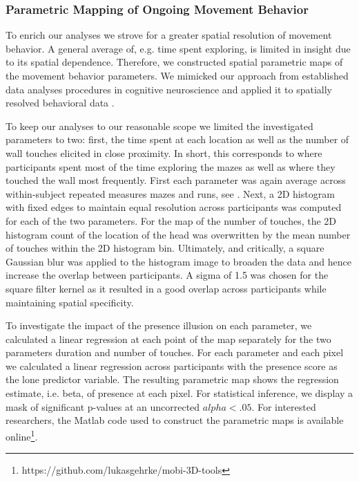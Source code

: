 \subsubsection{Parametric Mapping of Ongoing Movement Behavior} To enrich our analyses we strove for a greater spatial resolution of movement behavior. A general average of, e.g. time spent exploring, is limited in insight due to its spatial dependence. Therefore, we constructed spatial parametric maps of the movement behavior parameters. We mimicked our approach from established data analyses procedures in cognitive neuroscience and applied it to spatially resolved behavioral data \cite{Friston1994, Bridwell2018a}.

To keep our analyses to our reasonable scope we limited the investigated parameters to two: first, the time spent at each location as well as the number of wall touches elicited in close proximity. In short, this corresponds to where participants spent most of the time exploring the mazes as well as where they touched the wall most frequently. First each parameter was again average across within-subject repeated measures mazes and runs, see \cite{Gehrke2018}. Next, a 2D histogram with fixed edges to maintain equal resolution across participants was computed for each of the two parameters. For the map of the number of touches, the 2D histogram count of the location of the head was overwritten by the mean number of touches within the 2D histogram bin. Ultimately, and critically, a square Gaussian blur was applied to the histogram image to broaden the data and hence increase the overlap between participants. A sigma of 1.5 was chosen for the square filter kernel as it resulted in a good overlap across participants while maintaining spatial specificity.

To investigate the impact of the presence illusion on each parameter, we calculated a linear regression at each point of the map separately for the two parameters duration and number of touches. For each parameter and each pixel we calculated a linear regression across participants with the presence score as the lone predictor variable. The resulting parametric map shows the regression estimate, i.e. beta, of presence at each pixel. For statistical inference, we display a mask of significant p-values at an uncorrected $alpha < .05$. For interested researchers, the Matlab code used to construct the parametric maps is available online\footnote{https://github.com/lukasgehrke/mobi-3D-tools}.